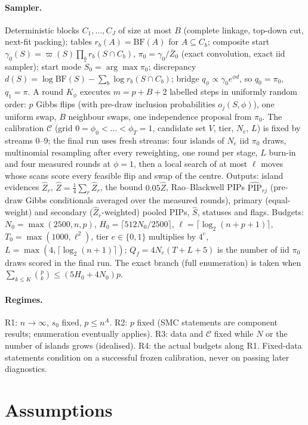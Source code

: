 \documentclass[11pt,a4paper]{article}
\theoremstyle{plain}
\theoremstyle{definition}
\theoremstyle{remark}
\newcommand{\calC}{\mathcal{C}}
\newcommand{\St}{\widetilde S_0}
\newcommand{\Shat}{\widehat S}
\newcommand{\sz}{s_0}
\newcommand{\PIPhat}{\widehat{\mathrm{PIP}}}
\newcommand{\Zhat}{\widehat Z}
\newcommand{\Zbar}{\bar Z}
\newcommand{\pizero}{\pi_0}
\newcommand{\BF}{\mathrm{BF}}
\newcommand{\Ne}{N_{e}}
\newcommand{\Qf}{Q_{f}}
\begin{document}
\paragraph{Sampler.} Deterministic blocks $C_1,\dots,C_J$ of size at most $B$ (complete linkage, top-down cut, next-fit packing); tables $r_b(A)=\BF(A)$ for $A\subseteq C_b$; composite start $\gamma_0(S)=\varpi(S)\prod_b r_b(S\cap C_b)$, $\pizero=\gamma_0/\Zbar_0$ (exact convolution, exact iid sampler); start mode $\St=\arg\max\pizero$; discrepancy $d(S)=\log\BF(S)-\sum_b\log r_b(S\cap C_b)$; bridge $q_\phi\propto\gamma_0e^{\phi d}$, so $q_0=\pizero$, $q_1=\pi$. A round $K_\phi$ executes $m=p+B+2$ labelled steps in uniformly random order: $p$ Gibbs flips (with pre-draw inclusion probabilities $o_j(S,\phi)$), one uniform swap, $B$ neighbour swaps, one independence proposal from $\pizero$. The calibration $\calC$ (grid $0=\phi_0<\dots<\phi_T=1$, candidate set $V$, tier, $\Ne$, $L$) is fixed by streams 0--9; the final run uses fresh streams: four islands of $\Ne$ iid $\pizero$ draws, multinomial resampling after every reweighting, one round per stage, $L$ burn-in and four measured rounds at $\phi=1$, then a local search of at most $\ell$ moves whose scans score every feasible flip and swap of the centre. Outputs: island evidences $\Zhat_r$, $\Zhat=\tfrac14\sum_r\Zhat_r$, the bound $0.05\Zhat$, Rao--Blackwell PIPs $\PIPhat_{rj}$ (pre-draw Gibbs conditionals averaged over the measured rounds), primary (equal-weight) and secondary ($\Zhat_r$-weighted) pooled PIPs, $\Shat$, statuses and flags. Budgets: $N_0=\max(2500,n,p)$, $H_0=\lceil 512N_0/2500\rceil$, $\ell=\lceil\log_2(n+p+1)\rceil$, $T_0=\max(1000,\ell^2)$, tier $e\in\{0,1\}$ multiplies by $4^e$, $L=\max(4,\lceil\log_2(n+1)\rceil)$; $\Qf=4\Ne(T+L+5)$ is the number of iid $\pizero$ draws scored in the final run. The exact branch (full enumeration) is taken when $\sum_{k\le K}\binom pk\le(5H_0+4N_0)p$.

\paragraph{Regimes.} R1: $n\to\infty$, $\sz$ fixed, $p\le n^A$. R2: $p$ fixed (SMC statements are component results; enumeration eventually applies). R3: data and $\calC$ fixed while $N$ or the number of islands grows (idealised). R4: the actual budgets along R1. Fixed-data statements condition on a successful frozen calibration, never on passing later diagnostics.

\section{Assumptions}\label{sec:assumptions}
\end{document}
